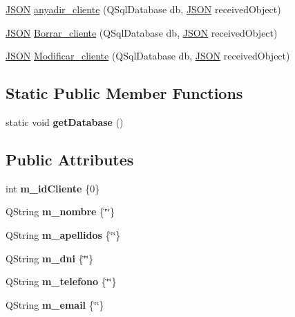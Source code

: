 \begin{DoxyCompactItemize}
\item 
\mbox{\hyperlink{classnlohmann_1_1basic__json}{J\+S\+ON}} \mbox{\hyperlink{classCliente_a7411b49f5697dbb2eb47bff72f5681d4}{anyadir\+\_\+cliente}} (Q\+Sql\+Database db, \mbox{\hyperlink{classnlohmann_1_1basic__json}{J\+S\+ON}} received\+Object)
\item 
\mbox{\hyperlink{classnlohmann_1_1basic__json}{J\+S\+ON}} \mbox{\hyperlink{classCliente_ae439ec32dce5171c876e9a6210ca8633}{Borrar\+\_\+cliente}} (Q\+Sql\+Database db, \mbox{\hyperlink{classnlohmann_1_1basic__json}{J\+S\+ON}} received\+Object)
\item 
\mbox{\hyperlink{classnlohmann_1_1basic__json}{J\+S\+ON}} \mbox{\hyperlink{classCliente_a157d0a57e3a159c60395b0ef7cbafec7}{Modificar\+\_\+cliente}} (Q\+Sql\+Database db, \mbox{\hyperlink{classnlohmann_1_1basic__json}{J\+S\+ON}} received\+Object)
\end{DoxyCompactItemize}
\subsection*{Static Public Member Functions}
\begin{DoxyCompactItemize}
\item 
\mbox{\label{classCliente_a56dd19c1b620d62e50fe632e1a39fee2}} 
static void {\bfseries get\+Database} ()
\end{DoxyCompactItemize}
\subsection*{Public Attributes}
\begin{DoxyCompactItemize}
\item 
\mbox{\label{classCliente_a378a16e32e275bc0a438621850b214a0}} 
int {\bfseries m\+\_\+id\+Cliente} \{0\}
\item 
\mbox{\label{classCliente_ae59e0a369e0a2c2244841b8bb1e72417}} 
Q\+String {\bfseries m\+\_\+nombre} \{\char`\"{}\char`\"{}\}
\item 
\mbox{\label{classCliente_a498d1e9c29bb09b2f234a2daa8b908af}} 
Q\+String {\bfseries m\+\_\+apellidos} \{\char`\"{}\char`\"{}\}
\item 
\mbox{\label{classCliente_ab19b5e88e6c7236cff04a966aa204a35}} 
Q\+String {\bfseries m\+\_\+dni} \{\char`\"{}\char`\"{}\}
\item 
\mbox{\label{classCliente_a60e2692da61d73083faaa5ed093f7609}} 
Q\+String {\bfseries m\+\_\+telefono} \{\char`\"{}\char`\"{}\}
\item 
\mbox{\label{classCliente_a9b604cb3030a93ce01ced3ba24c84338}} 
Q\+String {\bfseries m\+\_\+email} \{\char`\"{}\char`\"{}\}
\end{DoxyCompactItemize}


